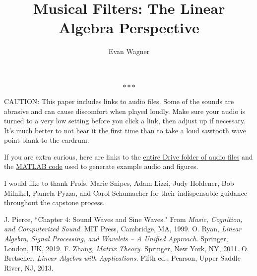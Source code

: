\documentclass[12pt,titlepage]{article}
\theoremstyle{definition}
\begin{document}
\title{Musical Filters: The Linear Algebra Perspective}
\author{Evan Wagner}
\maketitle

\tableofcontents

\vspace{.2in}

$$***$$

\vspace{.2in}

\par \noindent CAUTION: This paper includes links to audio files. Some of the sounds are abrasive and can cause discomfort when played loudly. Make sure your audio is turned to a very low setting before you click a link, then adjust up if necessary. It's much better to not hear it the first time than to take a loud sawtooth wave point blank to the eardrum.

\par \bigskip \noindent If you are extra curious, here are links to the \href{https://drive.google.com/drive/folders/16oMcnn9lQVPj5wKAWLB81FRDqUVUpard?usp=sharing}{\color{blue} entire Drive folder of audio files} and the \href{https://docs.google.com/document/d/1_Np-1anndUBNAp1EMfoEQONGKTgCt1KJEKgOH2-CGKg/edit?usp=sharing}{\color{blue} MATLAB code} used to generate example audio and figures.

\par \bigskip \noindent I would like to thank Profs. Marie Snipes, Adam Lizzi, Judy Holdener, Bob Milnikel, Pamela Pyzza, and Carol Schumacher for their indispensable guidance throughout the capstone process.

\newpage













\vspace{1in}

\begin{thebibliography}{99}
     J. Pierce, ``Chapter 4: Sound Waves and Sine Waves." From {\em Music, Cognition, and Computerized Sound.} MIT Press, Cambridge, MA, 1999.
     O. Ryan, {\em Linear Algebra, Signal Processing, and Wavelets -- A Unified Approach.} Springer, London, UK, 2019.
     F. Zhang, {\em Matrix Theory.} Springer, New York, NY, 2011.
     O. Bretscher, {\em Linear Algebra with Applications.} Fifth ed., Pearson, Upper Saddle River, NJ, 2013.
\end{thebibliography}
\end{document}
